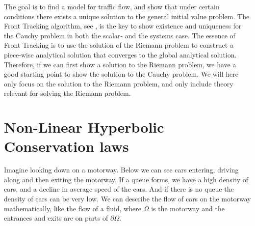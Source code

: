 \documentclass[10pt]{article}
\numberwithin{equation}{section}
\begin{document}
The goal is to find a model for traffic flow, and show that under certain conditions there exists a unique solution to the general initial value problem. The Front Tracking algorithm, see \cite{HoldenH.Helge2015Ftfh}, is the key to show existence and uniqueness for the Cauchy problem in both the scalar- and the systems case.  The essence of Front Tracking is to use the solution of the Riemann problem to construct a piece-wise analytical solution that converges to the global analytical solution. Therefore, if we can first show a solution to the Riemann problem, we have a good starting point to show the solution to the Cauchy problem. We will here only focus on the solution to the Riemann problem, and only include theory relevant for solving the Riemann problem. 

\newpage

\section{Non-Linear Hyperbolic Conservation laws}
Imagine looking down on a motorway. Below we can see cars entering, driving along and then exiting the motorway. If a queue forms, we have a high density of cars, and a decline in average speed of the cars.  And if there is no queue the density of cars can be very low. We can describe the flow of cars on the motorway mathematically, like the flow of a fluid,  where $\Omega$ is the motorway and the entrances and exits are on parts of $\partial \Omega$. 
\end{document}
